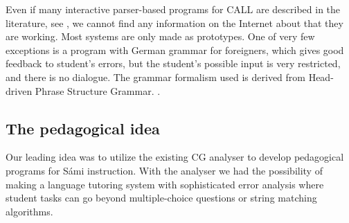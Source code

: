 \documentclass[11pt]{article}
\begin{document}
Even if many interactive parser-based programs for CALL are described in the literature, see \cite{Gamper:02,Heift:07}, we cannot find any information on the Internet about that they are working. Most systems are only made as prototypes. One of very few exceptions is a program with German grammar for foreigners, which gives good feedback to student's errors, but the student's possible input is very restricted, and there is no dialogue. The grammar formalism used is derived from Head-driven Phrase Structure Grammar. \cite{Heift:01,Heift:02}.








\subsection{The pedagogical idea} \label{pedidea}

Our leading idea was to utilize the existing CG analyser to develop pedagogical programs for Sámi instruction.  With the analyser we had the possibility of making a language tutoring system with sophisticated error analysis where student tasks can go beyond multiple-choice questions or string matching algorithms. 
\end{document}
